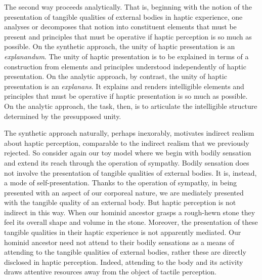 The second way proceeds analytically. That is, beginning with the notion of the presentation of tangible qualities of external bodies in haptic experience, one analyses or decomposes that notion into constituent elements that must be present and principles that must be operative if haptic perception is so much as possible. On the synthetic approach, the unity of haptic presentation is an \emph{explanandum}. The unity of haptic presentation is to be explained in terms of a construction from elements and principles understood independently of haptic presentation. On the analytic approach, by contrast, the unity of haptic presentation is an \emph{explanans}. It explains and renders intelligible elements and principles that must be operative if haptic presentation is so much as possible. On the analytic approach, the task, then, is to articulate the intelligible structure determined by the presupposed unity.

The synthetic approach naturally, perhaps inexorably, motivates indirect realism about haptic perception, comparable to the indirect realism that we previously rejected. So consider again our toy model where we begin with bodily sensation and extend its reach through the operation of sympathy. Bodily sensation does not involve the presentation of tangible qualities of external bodies. It is, instead, a mode of self-presentation. Thanks to the operation of sympathy, in being presented with an aspect of our corporeal nature, we are mediately presented with the tangible quality of an external body. But haptic perception is not indirect in this way. When our hominid ancestor grasps a rough-hewn stone they feel its overall shape and volume in the stone. Moreover, the presentation of these tangible qualities in their haptic experience is not apparently mediated. Our hominid ancestor need not attend to their bodily sensations as a means of attending to the tangible qualities of external bodies, rather these are directly disclosed in haptic perception. Indeed, attending to the body and its activity draws attentive resources away from the object of tactile perception. 



